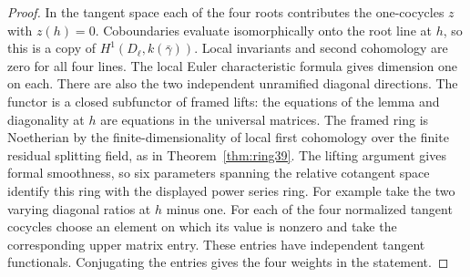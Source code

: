 \documentclass[a4paper,11pt]{article}
\theoremstyle{definition}
\theoremstyle{remark}
\numberwithin{equation}{section}
\begin{document}
\begin{proof}
In the tangent space each of the four roots contributes the
one-cocycles \(z\) with \(z(h)=0\). Coboundaries evaluate
isomorphically onto the root line at \(h\), so this is a copy of
\(H^1(D_\ell,k(\bar\gamma))\). Local invariants and second cohomology
are zero for all four lines. The local Euler characteristic formula
gives dimension one on each. There are also the two independent
unramified diagonal directions. The functor is a closed subfunctor
of framed lifts: the equations of the lemma and diagonality at \(h\)
are equations in the universal matrices. The framed ring is
Noetherian by the finite-dimensionality of local first cohomology
over the finite residual splitting field, as in
Theorem~\ref{thm:ring39}. The lifting argument gives formal
smoothness, so six parameters spanning the relative cotangent
space identify this ring with the displayed power series ring.
For example take the two varying diagonal ratios at \(h\) minus one.
For each of the four normalized tangent cocycles choose an element
on which its value is nonzero and take the corresponding upper
matrix entry. These entries have independent tangent functionals.
Conjugating the entries gives the four weights in the statement.
\end{proof}
\end{document}
